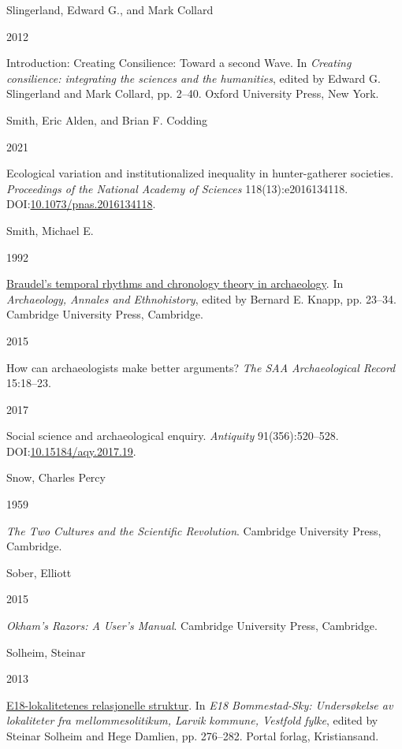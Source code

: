 \documentclass[
  12pt,
  a4paper,
  oneside]{book}
\newlength{\cslhangindent}
\newlength{\csllabelwidth}
\newlength{\cslentryspacingunit} %
\newenvironment{CSLReferences}[2] %
 {%
  \setlength{\parindent}{0pt}
  \ifodd #1
  \let\oldpar\par
  \def\par{\hangindent=\cslhangindent\oldpar}
  \fi
  \setlength{\parskip}{#2\cslentryspacingunit}
 }%
 {}
\newcommand{\CSLBlock}[1]{#1\hfill\break}
\newcommand{\CSLLeftMargin}[1]{\parbox[t]{\csllabelwidth}{#1}}
\newcommand{\CSLRightInline}[1]{\parbox[t]{\linewidth - \csllabelwidth}{#1}\break}
\begin{document}
\begin{CSLReferences}{0}{0}
\leavevmode{}%
\CSLBlock{Slingerland, Edward G., and Mark Collard}
\CSLLeftMargin{ 2012}
\CSLRightInline{{Introduction: Creating Consilience: Toward a second Wave}. In \emph{{Creating consilience: integrating the sciences and the humanities}}, edited by Edward G. Slingerland and Mark Collard, pp. 2--40. Oxford University Press, New York.}

\leavevmode{}%
\CSLBlock{Smith, Eric Alden, and Brian F. Codding}
\CSLLeftMargin{ 2021}
\CSLRightInline{{Ecological variation and institutionalized inequality in hunter-gatherer societies}. \emph{Proceedings of the National Academy of Sciences} 118(13):e2016134118. DOI:\href{https://doi.org/10.1073/pnas.2016134118}{10.1073/pnas.2016134118}.}

\leavevmode{}%
\CSLBlock{Smith, Michael E.}
\CSLLeftMargin{ 1992}
\CSLRightInline{\href{https://doi.org/10.1017/CBO9780511759949}{{Braudel's temporal rhythms and chronology theory in archaeology}}. In \emph{{Archaeology, Annales and Ethnohistory}}, edited by Bernard E. Knapp, pp. 23--34. Cambridge University Press, Cambridge.}

\leavevmode{}%
\CSLLeftMargin{ 2015 }
\CSLRightInline{{How can archaeologists make better arguments?} \emph{The SAA Archaeological Record} 15:18--23.}

\leavevmode{}%
\CSLLeftMargin{ 2017 }
\CSLRightInline{{Social science and archaeological enquiry}. \emph{Antiquity} 91(356):520--528. DOI:\href{https://doi.org/10.15184/aqy.2017.19}{10.15184/aqy.2017.19}.}

\leavevmode{}%
\CSLBlock{Snow, Charles Percy}
\CSLLeftMargin{ 1959}
\CSLRightInline{\emph{{The Two Cultures and the Scientific Revolution}}. Cambridge University Press, Cambridge.}

\leavevmode{}%
\CSLBlock{Sober, Elliott}
\CSLLeftMargin{ 2015}
\CSLRightInline{\emph{{Okham's Razors: A User's Manual}}. Cambridge University Press, Cambridge.}

\leavevmode{}%
\CSLBlock{Solheim, Steinar}
\CSLLeftMargin{ 2013}
\CSLRightInline{\href{https://doi.org/10.23865/noasp.53}{{E18-lokalitetenes relasjonelle struktur}}. In \emph{{E18 Bommestad-Sky: Undersøkelse av lokaliteter fra mellommesolitikum, Larvik kommune, Vestfold fylke}}, edited by Steinar Solheim and Hege Damlien, pp. 276--282. Portal forlag, Kristiansand.}


\end{CSLReferences}
\end{document}
